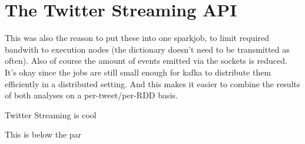 \chapter{The Twitter Streaming API}

This was also the reason to put these into one sparkjob, to limit required bandwith to execution nodes (the dictionary doesn't need to be transmitted as often).
Also of course the amount of events emitted via the sockets is reduced.
It's okay since the jobs are still small enough for kafka to distribute them efficiently in a distributed setting.
And this makes it easier to combine the results of both analyses on a per-tweet/per-RDD basis.

\label{chapter:Twitter Streaming}

Twitter Streaming is cool
\par
This is below the par